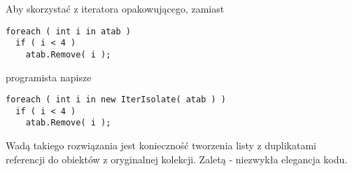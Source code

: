 Aby skorzystać z iteratora opakowującego, zamiast

\begin{scriptsize}
\begin{verbatim}
foreach ( int i in atab )
  if ( i < 4 )
    atab.Remove( i );
\end{verbatim}
\end{scriptsize}

programista napisze

\begin{scriptsize}
\begin{verbatim}
foreach ( int i in new IterIsolate( atab ) )
  if ( i < 4 )
    atab.Remove( i );
\end{verbatim}
\end{scriptsize}

Wadą takiego rozwiązania jest konieczność tworzenia listy z duplikatami referencji do obiektów
z oryginalnej kolekcji. Zaletą - niezwykła elegancja kodu. 

